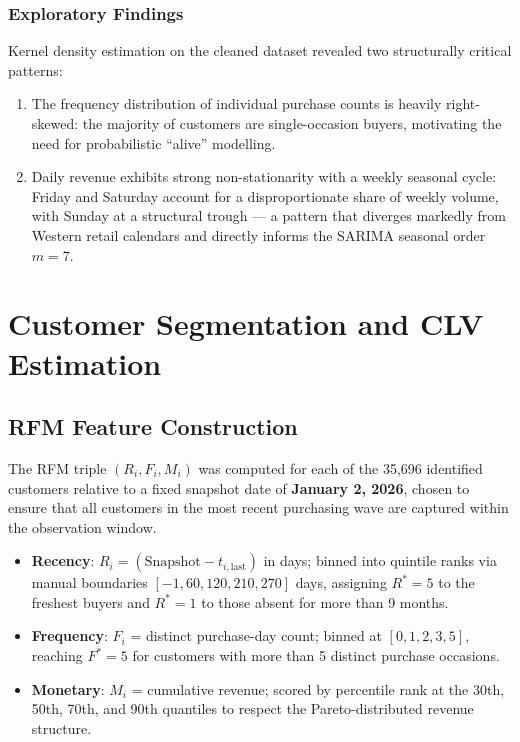 \subsubsection{Exploratory Findings}
Kernel density estimation on the cleaned dataset revealed two structurally critical patterns:
\begin{enumerate}[noitemsep]
    \item The frequency distribution of individual purchase counts is heavily right-skewed: the majority of customers are single-occasion buyers, motivating the need for probabilistic ``alive'' modelling.
    \item Daily revenue exhibits strong non-stationarity with a weekly seasonal cycle: Friday and Saturday account for a disproportionate share of weekly volume, with Sunday at a structural trough — a pattern that diverges markedly from Western retail calendars and directly informs the SARIMA seasonal order $m = 7$.
\end{enumerate}

\section{Customer Segmentation and CLV Estimation}

\subsection{RFM Feature Construction}

The RFM triple $(R_i, F_i, M_i)$ was computed for each of the 35,696 identified customers relative to a fixed snapshot date of \textbf{January 2, 2026}, chosen to ensure that all customers in the most recent purchasing wave are captured within the observation window.

\begin{itemize}[noitemsep]
    \item \textbf{Recency}: $R_i = (\text{Snapshot} - t_{i,\text{last}})$ in days; binned into quintile ranks via manual boundaries $[-1, 60, 120, 210, 270]$ days, assigning $R^* = 5$ to the freshest buyers and $R^* = 1$ to those absent for more than 9 months.
    \item \textbf{Frequency}: $F_i$ = distinct purchase-day count; binned at $[0, 1, 2, 3, 5]$, reaching $F^* = 5$ for customers with more than 5 distinct purchase occasions.
    \item \textbf{Monetary}: $M_i$ = cumulative revenue; scored by percentile rank at the 30th, 50th, 70th, and 90th quantiles to respect the Pareto-distributed revenue structure.
\end{itemize}

